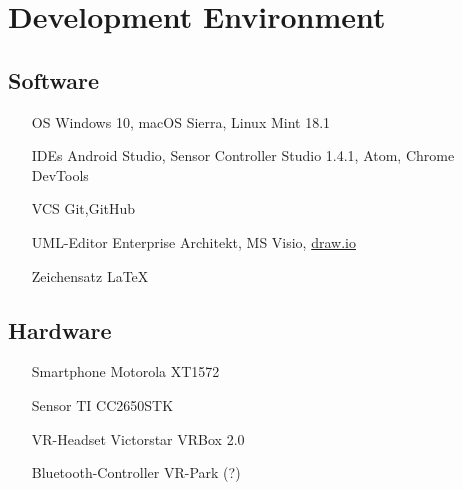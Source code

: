 \section{Development Environment}

\subsection{Software}

\begin{itemize}
  \item[OS] Windows 10, macOS Sierra, Linux Mint 18.1
  \item[IDEs]  Android Studio, Sensor Controller Studio 1.4.1, Atom, Chrome DevTools
  \item[VCS] Git,GitHub
  \item[UML-Editor] Enterprise Architekt, MS Visio, \href{draw.io}{draw.io}
  \item[Zeichensatz] \LaTeX

\end{itemize}

\subsection{Hardware}

\begin{itemize}
  \item[Smartphone] Motorola XT1572
  \item[Sensor] TI CC2650STK
  \item[VR-Headset] Victorstar VRBox 2.0
  \item[Bluetooth-Controller] VR-Park (?)
\end{itemize}
